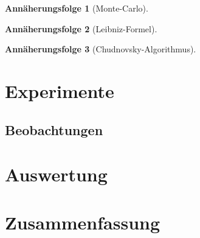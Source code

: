 \documentclass{scrartcl}
\newtheorem{approximation sequence}{Annäherungsfolge}
\begin{document}
\begin{approximation sequence}[Monte-Carlo]

\end{approximation sequence}

\begin{approximation sequence}[Leibniz-Formel]

\end{approximation sequence}

\begin{approximation sequence}[Chudnovsky-Algorithmus]

\end{approximation sequence}

\section{Experimente}

\subsection{Beobachtungen}

\section{Auswertung}

\section{Zusammenfassung}

\printbibliography
\end{document}
